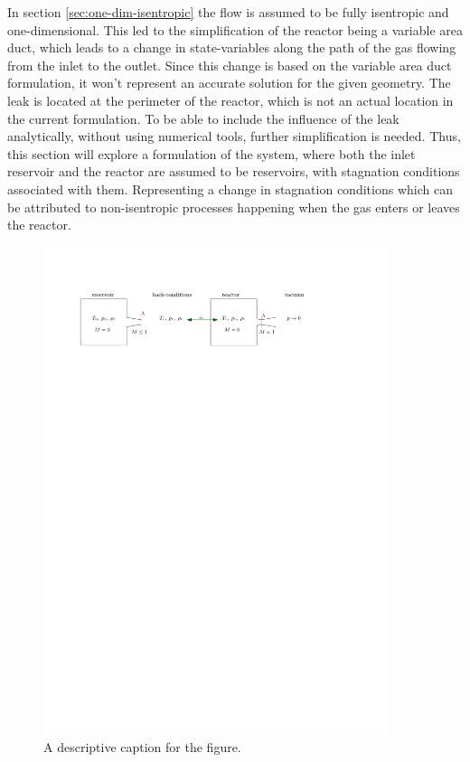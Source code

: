 In section \ref{sec:one-dim-isentropic} the flow is assumed to be fully isentropic and one-dimensional.
This led to the simplification of the reactor being a variable area duct, which leads to a change in state-variables along the path of the gas flowing from the inlet to the outlet.
Since this change is based on the variable area duct formulation, it won't represent an accurate solution for the given geometry.
The leak is located at the perimeter of the reactor, which is not an actual location in the current formulation.
To be able to include the influence of the leak analytically, without using numerical tools, further simplification is needed.
Thus, this section will explore a formulation of the system, where both the inlet reservoir and the reactor are assumed to be reservoirs, with stagnation conditions associated with them.
Representing a change in stagnation conditions which can be attributed to non-isentropic processes happening when the gas enters or leaves the reactor.

\begin{figure}[H]
    \centering
    \includegraphics[width=0.9\textwidth]{src/03_analytical-work/fig_disconnected-reservoirs.pdf}
    \caption{A descriptive caption for the figure.}
    \label{fig:disconnected-reservoirs}
\end{figure}




